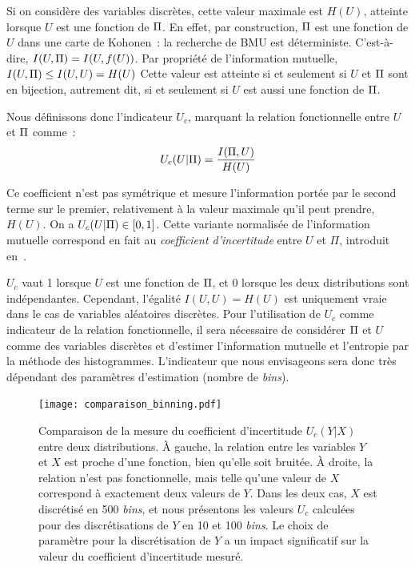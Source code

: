 \documentclass[../main]{subfiles}
\begin{document}
Si on considère des variables discrètes, cette valeur maximale est $H(U)$, atteinte lorsque $U$ est une fonction de $\Pi$.
En effet, par construction, $\Pi$ est une fonction de $U$ dans une carte de Kohonen~: la recherche de BMU est déterministe. C'est-à-dire, $I(U,\Pi) = I (U, f(U))$.
Par propriété de l'information mutuelle, $I(U,\Pi) \leq I(U,U) = H(U)$
Cette valeur est atteinte si et seulement si $U$ et $\Pi$ sont en bijection, autrement dit, si et seulement si $U$ est aussi une fonction de $\Pi$.

Nous définissons donc l'indicateur $U_c$, marquant la relation fonctionnelle entre $U$ et $\Pi$ comme~:
\begin{equation}
U_c(U|\Pi) = \frac{I(\Pi,U)}{H(U)}
\end{equation}

Ce coefficient n'est pas symétrique et mesure l'information portée par le second terme sur le premier, relativement à la valeur maximale qu'il peut prendre, $H(U)$. 
On a $U_c(U|\Pi) \in [0,1]$. 
Cette variante normalisée de l'information mutuelle correspond en fait au \emph{coefficient d'incertitude} entre $U$ et $\Pi$, introduit en~\cite{Theil1961EconomicFA}.

$U_c$ vaut 1 lorsque $U$ est une fonction de $\Pi$, et $0$ lorsque les deux distributions sont indépendantes.
Cependant, l'égalité $I(U,U) = H(U)$ est uniquement vraie dans le cas de variables aléatoires discrètes.
Pour l'utilisation de $U_c$ comme indicateur de la relation fonctionnelle, il sera nécessaire de considérer $\Pi$ et $U$ comme des variables discrètes et d'estimer l'information mutuelle et l'entropie par la méthode des histogrammes. L'indicateur que nous envisageons sera donc très dépendant des paramètres d'estimation (nombre de \emph{bins}).

\begin{figure}
    \centering
    \texttt{[image: comparaison\_binning.pdf]}
    \caption{Comparaison de la mesure du coefficient d'incertitude $U_c(Y|X)$ entre deux distributions. À gauche, la relation entre les variables $Y$ et $X$ est proche d'une fonction, bien qu'elle soit bruitée. À droite, la relation n'est pas fonctionnelle, mais telle qu'une valeur de $X$ correspond à exactement deux valeurs de $Y$. Dans les deux cas, $X$ est discrétisé en 500 \emph{bins}, et nous présentons les valeurs $U_c$ calculées pour des discrétisations de $Y$ en 10 et 100 \emph{bins}. Le choix de paramètre pour la discrétisation de $Y$ a un impact significatif sur la valeur du coefficient d'incertitude mesuré.}
    \label{fig:exemple-limite}
    \end{figure}
\end{document}
